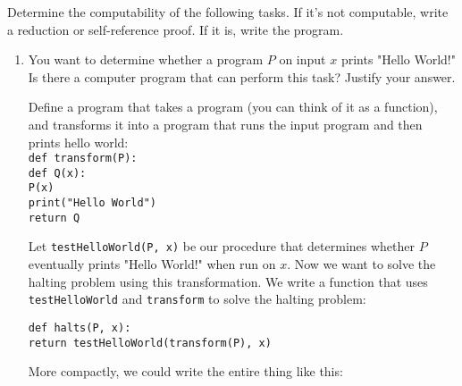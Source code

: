 \question Determine the computability of the following tasks. If it's not computable, write a reduction or self-reference proof. If it is, write the program.\\
\begin {enumerate}
\item You want to determine whether a program $P$ on input $x$ prints "Hello World!" Is there a computer program that can perform this task? Justify your answer. \\
\begin{solution}[.3 in]
Define a program that takes a program (you can think of it as a function), and transforms it into a program that runs the input program and then
prints hello world:\\

\texttt{def transform(P):}\\
\hphantom{xyz}\texttt{def Q(x):}\\
\hphantom{xyz}\hphantom{xyz}\texttt{P(x)}\\
\hphantom{xyz}\hphantom{xyz}\texttt{print("Hello World")}\\
\hphantom{xyz}\texttt{return Q}

Let \texttt{testHelloWorld(P, x)} be our procedure that determines whether $P$ eventually prints "Hello World!" when run on $x$.
Now we want to solve the halting problem using this transformation.
We write a function that uses \texttt{testHelloWorld} and \texttt{transform} to solve the halting problem:

\texttt{def halts(P, x):}\\
\hphantom{xyz}\texttt{return testHelloWorld(transform(P), x)}

More compactly, we could write the entire thing like this:


\end{solution}
\end{enumerate}
